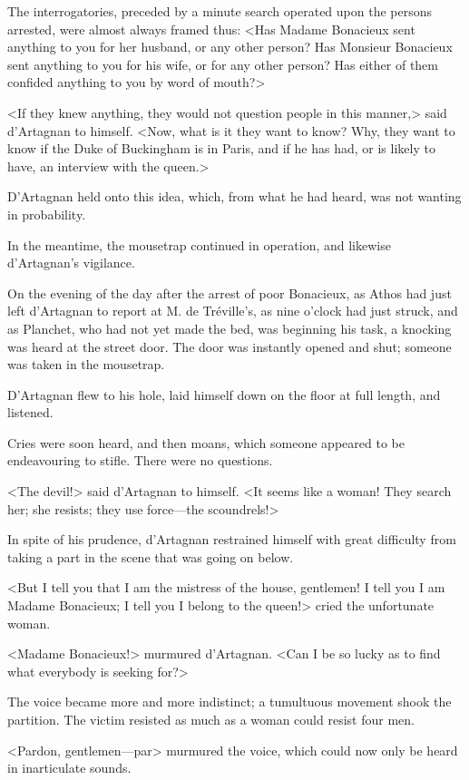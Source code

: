 The interrogatories, preceded by a minute search operated upon the persons arrested, were almost always framed thus: <Has Madame Bonacieux sent anything to you for her husband, or any other person? Has Monsieur Bonacieux sent anything to you for his wife, or for any other person? Has either of them confided anything to you by word of mouth?> 

<If they knew anything, they would not question people in this manner,> said d'Artagnan to himself. <Now, what is it they want to know? Why, they want to know if the Duke of Buckingham is in Paris, and if he has had, or is likely to have, an interview with the queen.> 

D'Artagnan held onto this idea, which, from what he had heard, was not wanting in probability. 

In the meantime, the mousetrap continued in operation, and likewise d'Artagnan's vigilance. 

On the evening of the day after the arrest of poor Bonacieux, as Athos had just left d'Artagnan to report at M. de Tréville's, as nine o'clock had just struck, and as Planchet, who had not yet made the bed, was beginning his task, a knocking was heard at the street door. The door was instantly opened and shut; someone was taken in the mousetrap. 

D'Artagnan flew to his hole, laid himself down on the floor at full length, and listened. 

Cries were soon heard, and then moans, which someone appeared to be endeavouring to stifle. There were no questions. 

<The devil!> said d'Artagnan to himself. <It seems like a woman! They search her; she resists; they use force---the scoundrels!> 

In spite of his prudence, d'Artagnan restrained himself with great difficulty from taking a part in the scene that was going on below. 

<But I tell you that I am the mistress of the house, gentlemen! I tell you I am Madame Bonacieux; I tell you I belong to the queen!> cried the unfortunate woman. 

<Madame Bonacieux!> murmured d'Artagnan. <Can I be so lucky as to find what everybody is seeking for?> 

The voice became more and more indistinct; a tumultuous movement shook the partition. The victim resisted as much as a woman could resist four men. 

<Pardon, gentlemen---par\longdash> murmured the voice, which could now only be heard in inarticulate sounds. 

